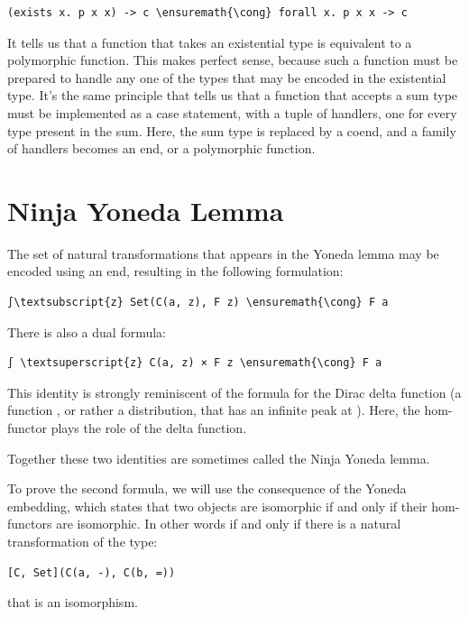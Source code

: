 \begin{Verbatim}[commandchars=\\\{\}]
(exists x. p x x) -> c \ensuremath{\cong} forall x. p x x -> c
\end{Verbatim}
It tells us that a function that takes an existential type is equivalent
to a polymorphic function. This makes perfect sense, because such a
function must be prepared to handle any one of the types that may be
encoded in the existential type. It's the same principle that tells us
that a function that accepts a sum type must be implemented as a case
statement, with a tuple of handlers, one for every type present in the
sum. Here, the sum type is replaced by a coend, and a family of handlers
becomes an end, or a polymorphic function.

\section{Ninja Yoneda Lemma}\label{ninja-yoneda-lemma}

The set of natural transformations that appears in the Yoneda lemma may
be encoded using an end, resulting in the following formulation:

\begin{Verbatim}[commandchars=\\\{\}]
∫\textsubscript{z} Set(C(a, z), F z) \ensuremath{\cong} F a
\end{Verbatim}
There is also a dual formula:

\begin{Verbatim}[commandchars=\\\{\}]
∫ \textsuperscript{z} C(a, z) × F z \ensuremath{\cong} F a
\end{Verbatim}
This identity is strongly reminiscent of the formula for the Dirac delta
function (a function , or rather a distribution, that
has an infinite peak at ). Here, the hom-functor plays
the role of the delta function.

Together these two identities are sometimes called the Ninja Yoneda
lemma.

To prove the second formula, we will use the consequence of the Yoneda
embedding, which states that two objects are isomorphic if and only if
their hom-functors are isomorphic. In other words  if
and only if there is a natural transformation of the type:

\begin{Verbatim}[commandchars=\\\{\}]
[C, Set](C(a, -), C(b, =))
\end{Verbatim}
that is an isomorphism.

